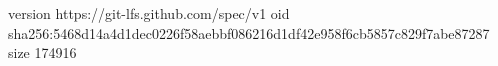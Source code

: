 version https://git-lfs.github.com/spec/v1
oid sha256:5468d14a4d1dec0226f58aebbf086216d1df42e958f6cb5857c829f7abe87287
size 174916
